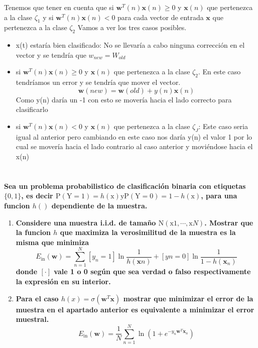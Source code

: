 \documentclass[titlepage]{article}
\begin{document}
  	 Tenemos que tener en cuenta que si $\mathbf{w}^{T}(n) \mathbf{x}(n)  \geq 0$ y $\mathbf{x}(n)$ que pertenezca a la clase $\zeta_{1}$ y si  $\mathbf{w}^{T}(n) \mathbf{x}(n)<0$ para cada vector de entrada $\mathbf{x}$ que pertenezca a la clase $\zeta_{2}$ 
  	 Vamos a ver los tres casos posibles. 
  	 \begin{itemize}
  	 	\item x(t) estaría bien clasificado: No se llevaría a cabo ninguna corrección en el vector y se tendría que $w_{new}=W_{old}$
  	 	\newline 
  	 	\item si $\mathbf{w}^{T}(n) \mathbf{x}(n) \geq 0$ y $\mathbf{x}(n)$ que pertenezca a la clase $\zeta_{2}$. En este caso tendríamos un error y se tendría que mover el vector.
  	 	$$
  	 	\mathbf{w}(new)=\mathbf{w}(old)+y(n) \mathbf{x}(n)
  	 	$$
  	 	Como y(n) daría un -1 con esto se movería hacia el lado correcto para clasificarlo
  	 	
  	 	\item si $\mathbf{w}^{T}(n) \mathbf{x}(n)<0$ y $\mathbf{x}(n)$ que pertenezca a la clase $\zeta_{J}$: Este caso seria igual al anterior pero cambiando en este caso nos daría y(n) el valor 1 por lo cual se movería hacia el lado contrario al caso anterior y moviéndose hacia el x(n)
  	 \end{itemize}
   
  	\section{}
  	\textbf{Sea un problema probabilistico de clasificación binaria con etiquetas $\{0,1\}$, es decir $\mathrm{P}(\mathrm{Y}=1)=h(\mathrm{x}) \mathrm{y} \mathrm{P}(\mathrm{Y}=0)=1-h(\mathrm{x})$, para una funcion $h()$ dependiente de la muestra.}
  	\begin{enumerate}
  		\item  \textbf{Considere  una muestra i.i.d. de tamaño $\mathrm{N}\left(\mathrm{x}{1}, \cdots, \mathrm{x}{N}\right)$. Mostrar que la funcion $h$ que maximiza la verosimilitud de la muestra es la misma que minimiza
  		$$E_{\mathrm{in}}(\mathbf{w})=\sum_{n=1}^{N}\left[y_{n}=1\right] \ln \frac{1}{h\left(\mathbf{x}{n}\right)}+\left[y{n}=0\right] \ln \frac{1}{1-h\left(\mathbf{x}_{n}\right)}$$ donde $[\cdot]$ vale 1 o 0 según que sea verdad o falso respectivamente la expresión en su interior.}
  		\item \textbf{Para el caso $h(x)=\sigma\left(\mathbf{w}^{T} \mathbf{x}\right)$ mostrar que minimizar el error de la muestra en el apartado anterior es equivalente a minimizar el error muestral. 
  		$$E_{\mathrm{in}}(\mathbf{w})=\frac{1}{N} \sum_{n=1}^{N} \ln \left(1+e^{-y_{n} \mathbf{w}^{T} \mathbf{x}_{n}}\right)$$}
  	\end{enumerate}
  
\end{document}

